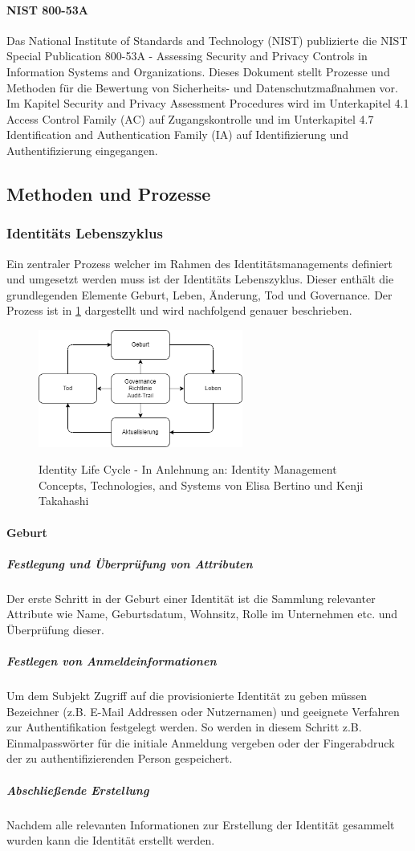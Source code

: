 \documentclass[12pt]{article}
\begin{document}
\paragraph{NIST 800-53A}
Das National Institute of Standards and Technology (NIST) publizierte die \glqq{}NIST Special Publication 800-53A - Assessing Security and Privacy Controls in Information Systems and Organizations\grqq{}. Dieses Dokument stellt Prozesse und Methoden für die Bewertung von Sicherheits- und Datenschutzmaßnahmen vor. Im Kapitel \glqq{}Security and Privacy Assessment Procedures\grqq{} wird im Unterkapitel 4.1 \glqq{}Access Control Family (AC)\grqq{} auf Zugangskontrolle und im Unterkapitel 4.7 \glqq{}Identification and Authentication Family (IA)\grqq{} auf Identifizierung und Authentifizierung eingegangen.
\subsection{Methoden und Prozesse}
\subsubsection{Identitäts Lebenszyklus}
Ein zentraler Prozess welcher im Rahmen des Identitätsmanagements definiert und umgesetzt werden muss ist der Identitäts Lebenszyklus. Dieser enthält die grundlegenden Elemente Geburt, Leben, Änderung, Tod und Governance. Der Prozess ist in \cref{fig:idlc} dargestellt und wird nachfolgend genauer beschrieben.~\cite{bertino2010identity}
\begin{figure}[H]
  \centering
  \includegraphics[width=0.6\textwidth]{assets/idlc.png}
  \label{fig:idlc}
  \caption{Identity Life Cycle - In Anlehnung an: Identity Management Concepts, Technologies, and Systems von Elisa Bertino und Kenji Takahashi}
\end{figure}
\paragraph{Geburt}
\subparagraph{Festlegung und Überprüfung von Attributen}
Der erste Schritt in der Geburt einer Identität ist die Sammlung relevanter Attribute wie Name, Geburtsdatum, Wohnsitz, Rolle im Unternehmen etc. und Überprüfung dieser.~\cite{bertino2010identity}
\subparagraph{Festlegen von Anmeldeinformationen}
Um dem Subjekt Zugriff auf die provisionierte Identität zu geben müssen Bezeichner (z.B. E-Mail Addressen oder Nutzernamen) und geeignete Verfahren zur Authentifikation festgelegt werden. So werden in diesem Schritt z.B. Einmalpasswörter für die initiale Anmeldung vergeben oder der Fingerabdruck der zu authentifizierenden Person gespeichert.~\cite{bertino2010identity}
\subparagraph{Abschließende Erstellung}
Nachdem alle relevanten Informationen zur Erstellung der Identität gesammelt wurden kann die Identität erstellt werden.~\cite{bertino2010identity}
\end{document}

